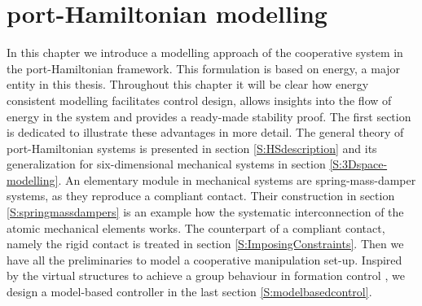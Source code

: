 \documentclass[a4paper,twoside, openright,12pt]{report}
\begin{document}
\chapter{port-Hamiltonian modelling}\label{C:pHS modelling}
In this chapter we introduce a modelling approach of the cooperative system in the port-Hamiltonian framework. This formulation is based on energy, a major entity in this thesis. Throughout this chapter it will be clear how energy consistent modelling facilitates control design, allows insights into the flow of energy in the system and provides a ready-made stability proof. The first section is dedicated to illustrate these advantages in more detail. The general theory of port-Hamiltonian systems is presented in section \ref{S:HSdescription} and its  generalization for six-dimensional mechanical systems in section \ref{S:3Dspace-modelling}. An elementary module in mechanical systems are spring-mass-damper systems, as they reproduce a compliant contact. Their construction in section \ref{S:springmassdampers} is an example how the systematic interconnection of the atomic mechanical elements works. The counterpart of a compliant contact, namely the rigid contact is treated in section \ref{S:ImposingConstraints}. Then we have all the preliminaries to model a cooperative manipulation set-up. Inspired by the virtual structures to achieve a group behaviour in formation control \cite{Lawton_03}, we design a model-based controller in the last section \ref{S:modelbasedcontrol}.
  
\end{document}
